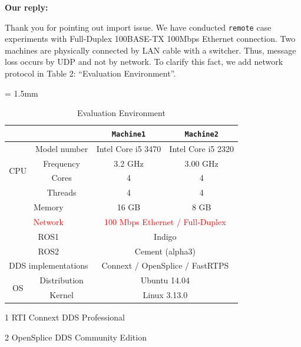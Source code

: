 \documentclass{article}
\begin{document}
\begin{enumerate}
  \begin{flushleft}
    \textbf{Our reply:}
  \end{flushleft}
  Thank you for pointing out import issue. 
  We have conducted \texttt{remote} case experiments with Full-Duplex 100BASE-TX 100Mbps Ethernet connection.
  Two machines are physically connected by LAN cable with a switcher.
  Thus, message loss occurs by UDP and not by network.
  To clarify this fact, we add network protocol in Table 2: ``Evaluation Environment''.
  \setcounter{table}{1}
  \begin{table}[H]
    \caption{Evaluation Environment} 
    \centering
    \begin{threeparttable}
      \renewcommand{\arraystretch}{1.0}
      \label{tb:environment}
      \small
      \tabcolsep = 1.5mm              %
      \begin{tabular}{c|c||c|c}
        \hline
        \multicolumn{2}{c||}{ } & \textbf{\texttt{Machine1}} & \textbf{\texttt{Machine2}} \\ \hline \hline
        \multirow{4}{*}{CPU}   & Model number & Intel Core i5 3470 & Intel Core i5 2320 \\ 
        & Frequency & 3.2 GHz & 3.00 GHz \\ 
        & Cores & 4 & 4 \\ 
        & Threads & 4 & 4 \\ \hline
        \multicolumn{2}{c||}{Memory} & 16 GB & 8 GB \\ \hline 
        \multicolumn{2}{c||}{\textcolor{red}{Network}} & \multicolumn{2}{c}{\textcolor{red}{100 Mbps Ethernet / Full-Duplex}} \\ \hline
        \multicolumn{2}{c||}{ROS1} & \multicolumn{2}{c}{Indigo} \\ 
        \multicolumn{2}{c||}{ROS2} & \multicolumn{2}{c}{Cement (alpha3)} \\ 
        \multicolumn{2}{c||}{DDS implementations} & \multicolumn{2}{c}{Connext\tnote{1} / OpenSplice\tnote{2} / FastRTPS } \\ \hline 
        \multirow{2}{*}{OS} & Distribution & \multicolumn{2}{c}{Ubuntu 14.04} \\ 
        & Kernel & \multicolumn{2}{c}{Linux 3.13.0} \\ \hline
      \end{tabular}
      \begin{tablenotes}
      \item[1] RTI Connext DDS Professional \cite{rti_connext}
      \item[2] OpenSplice DDS Community Edition \cite{ospl_dds_community}
      \end{tablenotes}
    \end{threeparttable}
  \end{table}
  

\end{enumerate}
\end{document}

